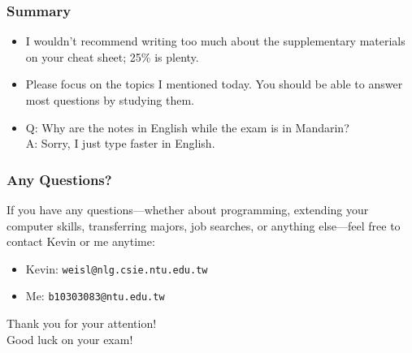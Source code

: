 \documentclass[10pt]{beamer}
\begin{document}
\begin{frame}
	\frametitle{Summary}

	\begin{itemize}
		\item I wouldn't recommend writing too much about the supplementary materials on your cheat sheet; 25\% is plenty.
		\item Please focus on the topics I mentioned today. You should be able to answer most questions by studying them.
		\item Q: Why are the notes in English while the exam is in Mandarin?\\ A: Sorry, I just type faster in English.
	\end{itemize}
\end{frame}

\begin{frame}
	\frametitle{Any Questions?}

	If you have any questions—whether about programming, extending your computer skills, transferring majors, job searches, or anything else—feel free to contact Kevin or me anytime:

	\begin{itemize}
		\item Kevin: \texttt{weisl@nlg.csie.ntu.edu.tw}
		\item Me: \texttt{b10303083@ntu.edu.tw}
	\end{itemize}
\end{frame}

\begin{frame}
	\begin{center}
		\Huge Thank you for your attention!\\
		\vspace{1cm}
		\Large Good luck on your exam!
	\end{center}
\end{frame}
\end{document}
